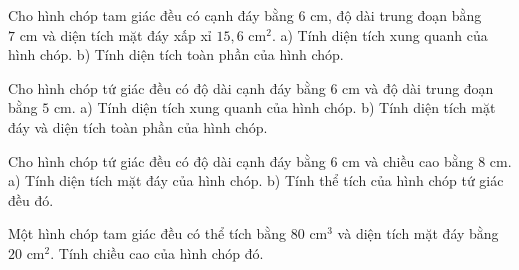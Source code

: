 \begin{bt}%
	Cho hình chóp tam giác đều có cạnh đáy bằng $6\text{ cm}$, độ dài trung đoạn bằng $7\text{ cm}$ và diện tích mặt đáy xấp xỉ $15{,}6\text{ cm}^2$.
a) Tính diện tích xung quanh của hình chóp.
b) Tính diện tích toàn phần của hình chóp.
\end{bt}

\begin{bt}%
	Cho hình chóp tứ giác đều có độ dài cạnh đáy bằng $6\text{ cm}$ và độ dài trung đoạn bằng $5\text{ cm}$.
a) Tính diện tích xung quanh của hình chóp.
b) Tính diện tích mặt đáy và diện tích toàn phần của hình chóp.
\end{bt}

\begin{bt}%
	Cho hình chóp tứ giác đều có độ dài cạnh đáy bằng $6\text{ cm}$ và chiều cao bằng $8\text{ cm}$.
a) Tính diện tích mặt đáy của hình chóp.
b) Tính thể tích của hình chóp tứ giác đều đó.
\end{bt}

\begin{bt}%
	Một hình chóp tam giác đều có thể tích bằng $80\text{ cm}^3$ và diện tích mặt đáy bằng $20\text{ cm}^2$. Tính chiều cao của hình chóp đó.
\end{bt}

